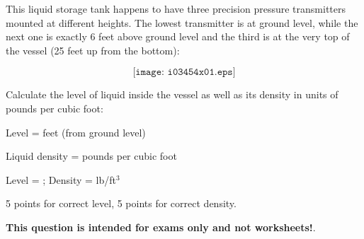 

This liquid storage tank happens to have three precision pressure transmitters mounted at different heights.  The lowest transmitter is at ground level, while the next one is exactly 6 feet above ground level and the third is at the very top of the vessel (25 feet up from the bottom):

$$\texttt{[image: i03454x01.eps]}$$

Calculate the level of liquid inside the vessel as well as its density in units of pounds per cubic foot:

\vskip 10pt

Level = \underbar{\hskip 50pt} feet (from ground level)

\vskip 10pt

Liquid density = \underbar{\hskip 50pt} pounds per cubic foot 







Level =  ; Density =  lb/ft$^{3}$

\vskip 10pt

5 points for correct level, 5 points for correct density.







{\bf This question is intended for exams only and not worksheets!}.


